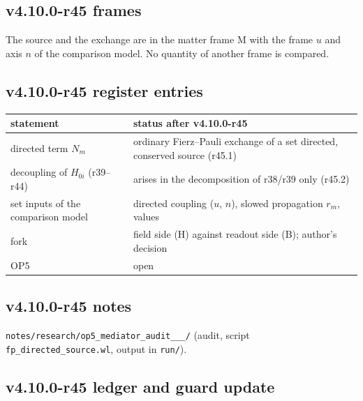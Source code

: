 \subsection*{v4.10.0-r45 frames}
\label{subsec:v4100-r45-frames}

The source and the exchange are in the matter frame M with the frame \(u\) and axis \(n\) of the comparison model.  No quantity of another frame is compared.

\subsection*{v4.10.0-r45 register entries}
\label{subsec:v4100-r45-register}

\begin{center}
\small
\begin{tabular}{@{}>{\raggedright\arraybackslash}p{}>{\raggedright\arraybackslash}p{}@{}}
\toprule
statement & status after v4.10.0-r45\\
\midrule
directed term \(N_m\) & ordinary Fierz--Pauli exchange of a set directed, conserved source (r45.1)\\
decoupling of \(H_{0i}\) (r39--r44) & arises in the decomposition of r38/r39 only (r45.2)\\
set inputs of the comparison model & directed coupling (\(u\), \(n\)), slowed propagation \(r_m\), values\\
fork & field side (H) against readout side (B); author's decision\\
OP5 & open\\
\bottomrule
\end{tabular}
\end{center}

\subsection*{v4.10.0-r45 notes}
\label{subsec:v4100-r45-notes}

\texttt{notes/\allowbreak research/\allowbreak op5\_\allowbreak mediator\_\allowbreak audit\_\_\_/} (audit, script \texttt{fp\_\allowbreak directed\_\allowbreak source.wl}, output in
\texttt{run/}).

\subsection*{v4.10.0-r45 ledger and guard update}
\label{subsec:v4100-r45-ledger-guard}

